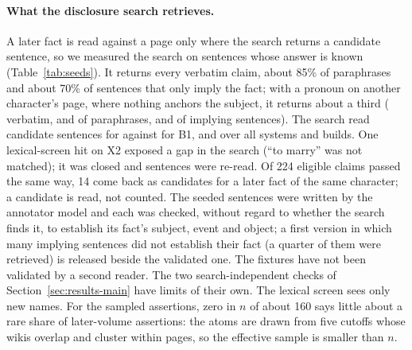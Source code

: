 \paragraph{What the disclosure search retrieves.}
A later fact is read against a page only where the search returns a candidate sentence, so we
measured the search on sentences whose answer is known (Table~\ref{tab:seeds}). It returns
every verbatim claim, about 85\% of paraphrases and about 70\% of sentences that only imply
the fact; with a pronoun on another character's page, where nothing anchors the subject, it
returns about a third ( verbatim,  and 
of paraphrases,  and  of implying sentences). The
search read  candidate sentences for \sys against
 for B1, and  over all systems and builds. One
lexical-screen hit on X2 exposed a gap in the search (``to marry'' was not matched); it was
closed and  sentences were re-read. Of 224 eligible claims passed the same way, 14 come back as candidates
for a later fact of the same character; a candidate is read, not counted. The seeded
sentences were written by the annotator model and each was checked, without regard to whether
the search finds it, to establish its fact's subject, event and object; a first version in
which many implying sentences did not establish their fact (a quarter of them were retrieved)
is released beside the validated one. The fixtures have not been validated by a second
reader. The two search-independent checks of Section~\ref{sec:results-main} have limits of
their own. The lexical screen sees only new names. For the sampled assertions, zero in $n$
of about 160 says little about a rare share of later-volume assertions: the atoms are drawn
from five cutoffs whose wikis overlap and cluster within pages, so the effective sample is
smaller than $n$.

